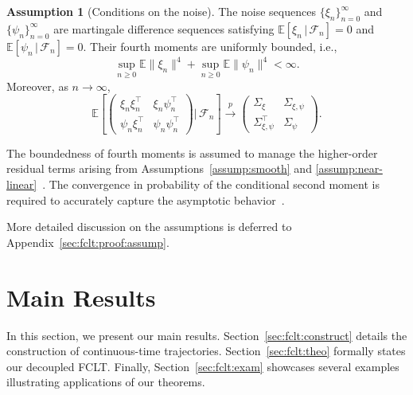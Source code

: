 \documentclass[11pt]{article}
\theoremstyle{plain}
\theoremstyle{definition}
\newtheorem{assump}{Assumption}[section]
\def\Hsmooth{{\delta_H}}
\def\Fsmooth{{\delta_F}}
\def\Gsmooth{{\delta_G}}
\def\FM{{\mathcal F}}
\def\EB{{\mathbb E}}
\begin{document}
\begin{assump}[Conditions on the noise]\label{assump:noise-fclt}
	The noise sequences $\{ \xi_{n} \}_{n=0}^\infty$ and $\{ \psi_{n} \}_{n=0}^\infty$ are martingale difference sequences satisfying $\EB[ \xi_{n} \,|\, \FM_{n}] = 0$ and $\EB [ \psi_{n} \,|\, \FM_{n}] = 0$.
	Their fourth moments are uniformly bounded, i.e.,
	\begin{equation*}
		\sup_{n \ge 0} \EB \| \xi_{n} \|^4 + \sup_{n \ge 0} \EB \| \psi_{n} \|^{4} < \infty.
	\end{equation*}
	Moreover, as $n \to \infty$, 
	\begin{equation*}
		\EB \left[ \begin{pmatrix}
			\xi_{n} \xi_{n}^\top & \xi_{n} \psi_{n}^\top \\
			\psi_{n} \xi_{n}^\top & \psi_{n} \psi_{n}^\top
		\end{pmatrix}  \Bigg|\, \FM_{n} \right]
		\overset{p}{\to} 
		\begin{pmatrix}
			\Sigma_{\xi} & \Sigma_{\xi, \psi} \\
			\Sigma_{\xi, \psi}^\top & \Sigma_{\psi}
		\end{pmatrix}.
	\end{equation*}
\end{assump}

The boundedness of fourth moments is assumed to manage the higher-order residual terms arising from Assumptions~\ref{assump:smooth} and \ref{assump:near-linear}~\citep{han2024finite}. The convergence in probability of the conditional second moment is required to accurately capture the asymptotic behavior~\citep{polyak1992acceleration, mokkadem2006convergence}.

More detailed discussion on the assumptions is deferred to Appendix~\ref{sec:fclt:proof:assump}.


\section{Main Results}
\label{sec:fclt:main}
In this section, we present our main results. Section~\ref{sec:fclt:construct} details the construction of continuous-time trajectories. Section~\ref{sec:fclt:theo} formally states our decoupled FCLT. Finally, Section~\ref{sec:fclt:exam} showcases several examples illustrating applications of our theorems.
\end{document}
